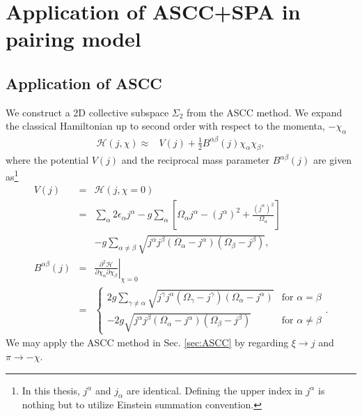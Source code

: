 \documentclass[11pt]{book} %
\begin{document}

\section{Application of ASCC+SPA in pairing model}
\label{4-2}

\subsection{Application of ASCC}

We construct a 2D collective subspace $\Sigma_2$ from the ASCC method.
We expand the classical Hamiltonian up to second order with respect to
the momenta, $-\chi_{\alpha}$
\begin{align}
  \mathcal{H}(j,\chi) \approx& V(j) + \frac{1}{2}B^{\alpha\beta}(j)\chi_{\alpha}\chi_{\beta},
\end{align}
where the potential $V(j)$ and the reciprocal mass parameter
$B^{\alpha\beta}(j)$ are given as\footnote{In this thesis, $j^{\alpha}$ and $j_{\alpha}$ are identical. Defining the upper index in $j^{\alpha}$ is nothing but to utilize Einstein summation convention.}
\begin{eqnarray}
  V(j) &=& \mathcal{H}(j,\chi=0) \nonumber \\
	&=& \sum_{\alpha} 2\epsilon_{\alpha}j^{\alpha} - g\sum_{\alpha} \left[ \Omega_{\alpha}j^{\alpha} - (j^{\alpha})^2 +\frac{(j^{\alpha})^2}{\Omega_{\alpha}} \right] \nonumber \\
  &&- g\sum_{\alpha\ne \beta} \sqrt{j^{\alpha}j^{\beta}(\Omega_{\alpha}-j^{\alpha})(\Omega_{\beta}-j^{\beta})}, \\	
B^{\alpha\beta}(j) &=& \left. \frac{\partial^2\mathcal{H}}{\partial\chi_{\alpha}\partial\chi_{\beta}} \right|_{\chi=0} \\
\label{mass}
&=&
	\begin{cases}
2g\sum_{\gamma\ne \alpha} \sqrt{j^{\gamma}j^{\alpha}(\Omega_{\gamma}-j^{\gamma})(\Omega_{\alpha}-j^{\alpha})}
		& \text{for $\alpha=\beta$} \\
-2g\sqrt{j^{\alpha}j^{\beta}(\Omega_{\alpha}-j^{\alpha})(\Omega_{\beta}-j^{\beta})}
		& \text{for $\alpha\ne\beta$}
	\end{cases}. \nonumber
\end{eqnarray}
We may apply the ASCC method in Sec. \ref{sec:ASCC}
by regarding $\xi\to j$ and $\pi\to-\chi$.
\end{document}
